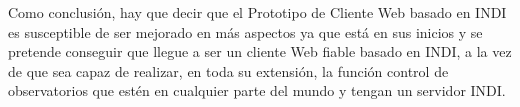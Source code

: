 Como conclusión, hay que decir que el Prototipo de Cliente Web basado en INDI es susceptible de ser mejorado en más aspectos ya que está en sus inicios y se pretende conseguir que llegue a ser un cliente Web fiable basado en INDI, a la vez de que sea capaz de realizar, en toda su extensión, la función control de observatorios que estén en cualquier parte del mundo y tengan un servidor INDI.\\

